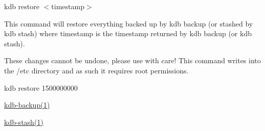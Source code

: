 {\ttfamily kdb restore $<$timestamp$>$}

This command will restore everything backed up by {\ttfamily kdb backup} (or stashed by {\ttfamily kdb stash}) where {\ttfamily timestamp} is the timestamp returned by {\ttfamily kdb backup} (or {\ttfamily kdb stash}).

These changes cannot be undone, please use with care! This command writes into the {\ttfamily /etc} directory and as such it requires root permissions.


\begin{DoxyCode}
kdb restore 1500000000
\end{DoxyCode}



\begin{DoxyItemize}
\item \hyperlink{doc_help_kdb-backup_md}{kdb-\/backup(1)}
\item \hyperlink{doc_help_kdb-stash_md}{kdb-\/stash(1)} 
\end{DoxyItemize}